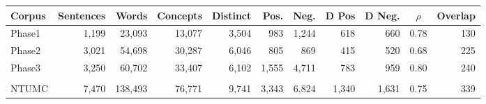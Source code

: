 \begin{tabular}{lrrrrrrrrcr}
 Corpus & Sentences & Words & Concepts & Distinct & Pos. & Neg. & D Pos & D Neg. & $\rho$ & Overlap \\ \hline
Phase1 & 1,199 & 23,093 & 13,077 & 3,504 & 983 & 1,244 & 618 & 660 & 0.78 & 130 \\
Phase2 & 3,021 & 54,698 & 30,287 & 6,046 & 805 & 869 & 415 & 520 & 0.68 & 225 \\
Phase3 & 3,250 & 60,702 & 33,407 & 6,102 & 1,555 & 4,711 & 783 & 959 & 0.80 & 240 \\
\\[-2.0ex]
NTUMC & 7,470 & 138,493 & 76,771 & 9,741 & 3,343 & 6,824 & 1,340 & 1,631 & 0.75 & 339 \\
\end{tabular}
